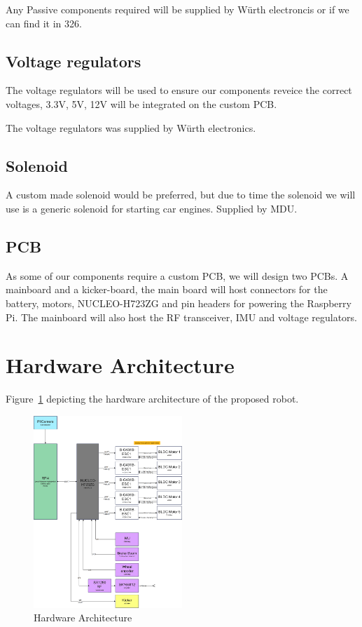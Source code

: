 \documentclass[a4paper,8pt]{article}
\begin{document}
  Any Passive components required will be supplied by Würth electroncis
  or if we can find it in 326.

  \subsection{Voltage regulators}

  The voltage regulators will be used to ensure our components reveice
  the correct voltages, 3.3V, 5V, 12V will be integrated on the custom
  PCB.

  The voltage regulators was supplied by Würth electronics.

  \subsection{Solenoid}

  A custom made solenoid would be preferred, but due to time the
  solenoid we will use is a generic solenoid for starting car engines.
  Supplied by MDU.
  
  \subsection{PCB}

  As some of our components require a custom PCB, we will design two
  PCBs. A mainboard and a kicker-board, the main board will host
  connectors for the battery, motors, NUCLEO-H723ZG and pin headers for
  powering the Raspberry Pi. The mainboard will also host the RF
  transceiver, IMU and voltage regulators.

  \section{Hardware Architecture}

  Figure~\ref{fig:hardware_architecture} depicting the hardware
  architecture of the proposed robot.

  \begin{figure}[H]
    \begin{center}
      \includegraphics[width=0.5\textwidth]{Hardware_architecture.png}
    \end{center}
    \caption{Hardware Architecture}
    \label{fig:hardware_architecture}
  \end{figure}
\end{document}
